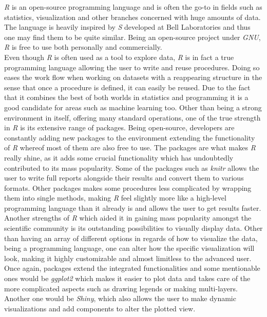 \documentclass[Report.tex]{subfiles}
\begin{document}
 
\emph{R} is an open-source programming language and is often the go-to in fields such as statistics, visualization and other branches concerned with huge amounts of data. The language is heavily inspired by \emph{S} developed at Bell Laboratories and thus one may find them to be quite similar. Being an open-source project under \emph{GNU}, \emph{R} is free to use both personally and commercially.\\

Even though \emph{R} is often used as a tool to explore data, \emph{R} is in fact a true programming language allowing the user to write and reuse procedures. Doing so eases the work flow when working on datasets with a reappearing structure in the sense that once a procedure is defined, it can easily be reused. Due to the fact that it combines the best of both worlds in statistics and programming it is a good candidate for areas such as machine learning too. Other than being a strong environment in itself, offering many standard operations, one of the true strength in \emph{R} is its extensive range of packages. Being open-source, developers are constantly adding new packages to the environment extending the functionality of \emph{R} whereof most of them are also free to use. The packages are what makes \emph{R} really shine, as it adds some crucial functionality which has undoubtedly contributed to its mass popularity. Some of the packages such as \emph{knitr} allows the user to write full reports alongside their results and convert them to various formats. Other packages makes some procedures less complicated by wrapping them into single methods, making \emph{R} feel slightly more like a high-level programming language than it already is and allows the user to get results faster. Another strengths of \emph{R} which aided it in gaining mass popularity amongst the scientific community is its outstanding possibilities to visually display data. Other than having an array of different options in regards of how to visualize the data, being a programming language, one can alter how the specific visualization will look, making it highly customizable and almost limitless to the advanced user. Once again, packages extend the integrated functionalities and some mentionable ones would be \emph{ggplot2} which makes it easier to plot data and takes care of the more complicated aspects such as drawing legends or making multi-layers. Another one would be \emph{Shiny}, which also allows the user to make dynamic visualizations and add components to alter the plotted view. \\
 
\end{document}
